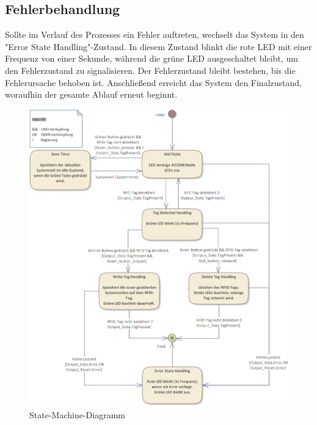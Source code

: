 \subsection*{Fehlerbehandlung}
\label{subsec:Fehlerbehandlung}

Sollte im Verlauf des Prozesses ein Fehler auftreten, wechselt das System in den "Error State Handling"-Zustand. In diesem Zustand blinkt die rote LED mit einer Frequenz von einer Sekunde, während die grüne LED ausgeschaltet bleibt, um den Fehlerzustand zu signalisieren. Der Fehlerzustand bleibt bestehen, bis die Fehlerursache behoben ist. Anschließend erreicht das System den Finalzustand, woraufhin der gesamte Ablauf erneut beginnt.
\begin{figure}[h!]
	\centering
	\includegraphics[width=1.0\textwidth]{images/StateMachine.png}
	\caption{State-Machine-Diagramm}
	\label{fig:StateMachineDiagramm}
\end{figure}

